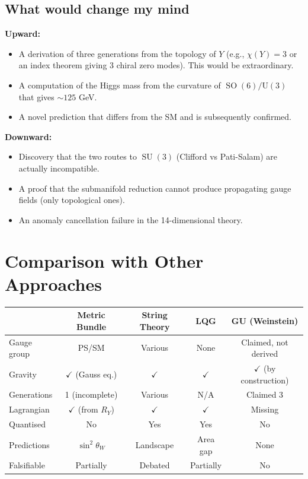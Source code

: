 \documentclass[12pt,a4paper]{article}
\DeclareMathOperator{\SO}{SO}
\DeclareMathOperator{\SU}{SU}
\begin{document}
\begin{honestbox}
\subsection*{What would change my mind}

\textbf{Upward:}
\begin{itemize}
\item A derivation of three generations from the topology of $Y$ (e.g., $\chi(Y) = 3$ or an index theorem giving 3 chiral zero modes). This would be extraordinary.
\item A computation of the Higgs mass from the curvature of $\SO(6)/\mathrm{U}(3)$ that gives $\sim 125$ GeV.
\item A novel prediction that differs from the SM and is subsequently confirmed.
\end{itemize}

\textbf{Downward:}
\begin{itemize}
\item Discovery that the two routes to $\SU(3)$ (Clifford vs Pati-Salam) are actually incompatible.
\item A proof that the submanifold reduction cannot produce propagating gauge fields (only topological ones).
\item An anomaly cancellation failure in the 14-dimensional theory.
\end{itemize}
\end{honestbox}

\section{Comparison with Other Approaches}

\begin{center}
\begin{tabular}{lcccc}
\toprule
& \textbf{Metric Bundle} & \textbf{String Theory} & \textbf{LQG} & \textbf{GU (Weinstein)} \\
\midrule
Gauge group & PS/SM & Various & None & Claimed, not derived \\
Gravity & $\checkmark$ (Gauss eq.) & $\checkmark$ & $\checkmark$ & $\checkmark$ (by construction) \\
Generations & 1 (incomplete) & Various & N/A & Claimed 3 \\
Lagrangian & $\checkmark$ (from $R_Y$) & $\checkmark$ & $\checkmark$ & Missing \\
Quantised & No & Yes & Yes & No \\
Predictions & $\sin^2\theta_W$ & Landscape & Area gap & None \\
Falsifiable & Partially & Debated & Partially & No \\
\bottomrule
\end{tabular}
\end{center}
\end{document}
